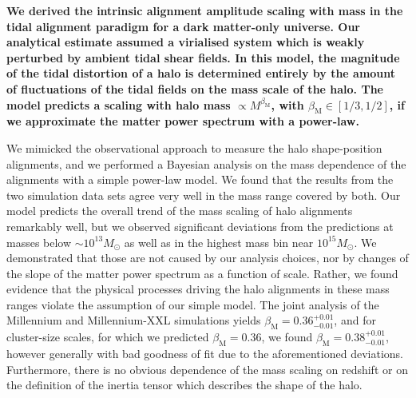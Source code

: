 \documentclass[a4paper,fleqn,usenatbib]{mnras}
\newenvironment{correction}
 {\bfseries}%
  {}%
\begin{document}
\begin{correction} We derived the intrinsic alignment amplitude scaling with mass in the tidal alignment paradigm for a dark matter-only universe. Our analytical estimate assumed a virialised system which is weakly perturbed by ambient tidal shear fields. In this model, the magnitude of the tidal distortion of a halo is determined entirely by the amount of fluctuations of the tidal fields on the mass scale of the halo. The model predicts a scaling with halo mass $\propto M^{\beta_{\mathrm{M}}}$, with $\beta_{\mathrm{M}} \in [1/3, 1/2]$, if we approximate the matter power spectrum with a power-law. 


We mimicked the observational approach to measure the halo shape-position alignments, and we performed a Bayesian analysis on the mass dependence of the alignments with a simple power-law model. We found that the results from the two simulation data sets agree very well in the mass range covered by both. Our model predicts the overall trend of the mass scaling of halo alignments remarkably well, but we observed significant deviations from the predictions at masses below $\sim 10^{13} M_\odot$ as well as in the highest mass bin near $10^{15} M_\odot$. We demonstrated that those are not caused by our analysis choices, nor by changes of the slope of the matter power spectrum as a function of scale. Rather, we found evidence that the physical processes driving the halo alignments in these mass ranges violate the assumption of our simple model. The joint analysis of the Millennium and Millennium-XXL simulations yields $\beta_{\mathrm{M}} = 0.36^{+0.01}_{-0.01}$, and for cluster-size scales, for which we predicted $\beta_{\mathrm{M}} = 0.36$, we found $\beta_{\mathrm{M}} =0.38^{+0.01}_{-0.01}$, however generally with bad goodness of fit due to the aforementioned deviations. Furthermore, there is no obvious dependence of the mass scaling on redshift or on the definition of the inertia tensor which describes the shape of the halo.



\end{correction}
\end{document}
